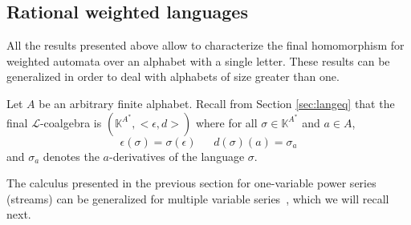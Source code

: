 \documentclass[3p]{elsarticle}
\newcommand{\X}{\mathcal{X}}           %
\newcommand{\fL}{\mathcal{L}}    %
\newcommand{\emp}{\epsilon}           %
\newcommand{\der}{d}           %
\newcommand{\K}{\mathbb{K}}            %
\begin{document}
\subsection{Rational weighted languages}
\label{Rational weighted languages}

\newcommand\Xa{\X_a}
\newcommand\Xb{\X_b}
All the results presented above allow to characterize the final
homomorphism for weighted automata over an alphabet with a single
letter. These results can be generalized in order to deal with
alphabets of size greater than one.

Let $A$ be an arbitrary finite alphabet.
%
 Recall from Section \ref{sec:langeq} that the final $\fL$-coalgebra
is $(\K^{A^*}, <\emp,\der>)$ where for all $\sigma\in
 \K^{A^*}$ and $a\in A$,
\[
\emp(\sigma) = \sigma(\epsilon)\ \ \ \ \ \ \  \der(\sigma)(a) =
\sigma_a
\]
and $\sigma_a$ denotes the $a$-derivatives of the language $\sigma$.

The calculus presented in the previous section for one-variable power
series (streams) can be generalized for multiple variable
series~\cite{Rutten2003-behavioural-differential-equations}, which we
will recall next.
\end{document}
